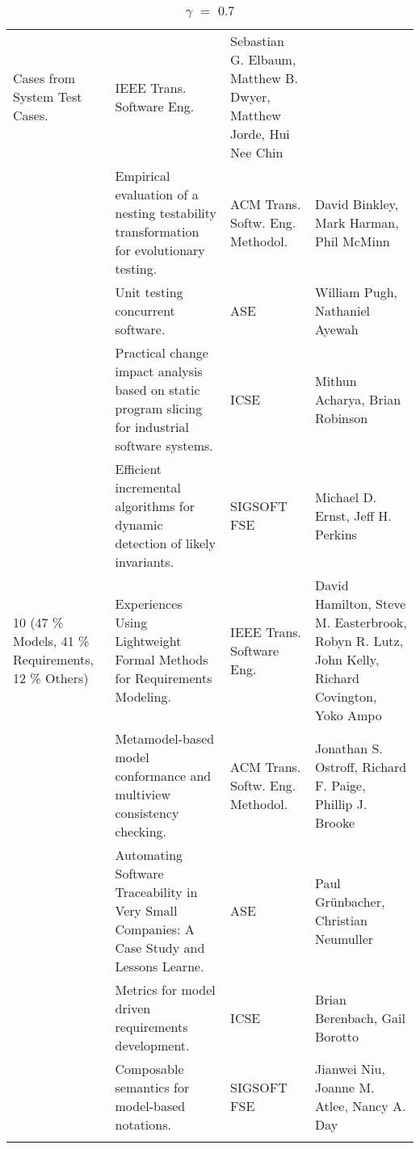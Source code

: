 \begin{center}
\begin{longtable}{|p{}p{}p{}p{}|}
Cases from System 
Test Cases.& IEEE Trans. Software Eng.& Sebastian G. Elbaum, Matthew B. Dwyer, Matthew Jorde, Hui 
Nee Chin \\
 & Empirical evaluation of a nesting testability transformation for evolutionary testing.& ACM 
Trans. Softw. Eng. Methodol.& David Binkley, Mark Harman, Phil McMinn \\
\rowcolor{black!20} & Unit testing concurrent software.& ASE& William Pugh, Nathaniel Ayewah \\
 & Practical change impact analysis based on static program slicing for industrial software 
systems.& ICSE& Mithun Acharya, Brian Robinson \\
\rowcolor{black!20} & Efficient incremental algorithms for dynamic detection of likely invariants.& 
SIGSOFT FSE& Michael D. Ernst, Jeff H. Perkins \\
10 (47 \% Models, 41 \% Requirements, 12 \% Others) & Experiences Using Lightweight Formal Methods 
for Requirements Modeling.& IEEE Trans. 
Software Eng.& David Hamilton, Steve M. Easterbrook, Robyn R. Lutz, John Kelly, Richard Covington, 
Yoko Ampo\\
\rowcolor{black!20} & Metamodel-based model conformance and multiview consistency checking.& ACM 
Trans. Softw. Eng. Methodol.& Jonathan S. Ostroff, Richard F. Paige, Phillip J. Brooke \\
 & Automating Software Traceability in Very Small Companies: A Case Study and Lessons Learne.& ASE& 
Paul Grünbacher, Christian Neumuller \\
\rowcolor{black!20} & Metrics for model driven requirements development.& ICSE& Brian Berenbach, 
Gail Borotto \\
 & Composable semantics for model-based notations.& SIGSOFT FSE& Jianwei Niu, Joanne M. Atlee, Nancy 
A. Day \\
    \hline
    \caption {$\gamma$ $=$ $0.7$}
\end{longtable}
\end{center}